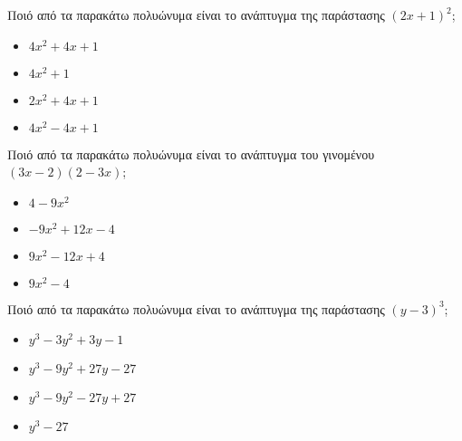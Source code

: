 \documentclass[ektypwsh]{diag-xelatex}
\begin{document}
\begin{thema}
\begin{rlist}
\begin{multicols}{4}
\end{multicols}
\item Ποιό από τα παρακάτω πολυώνυμα είναι το ανάπτυγμα της παράστασης $ (2x+1)^2 $;
\begin{multicols}{4}
\begin{itemize}
\item $ 4x^2+4x+1 $
\item $ 4x^2+1 $
\item $ 2x^2+4x+1 $
\item $ 4x^2-4x+1 $
\end{itemize}
\end{multicols}
\item Ποιό από τα παρακάτω πολυώνυμα είναι το ανάπτυγμα του γινομένου $ (3x-2)(2-3x) $;
\begin{multicols}{4}
\begin{itemize}
\item $ 4-9x^2 $
\item $ -9x^2+12x-4 $
\item $ 9x^2-12x+4 $
\item $ 9x^2-4 $
\end{itemize}
\end{multicols}
\item Ποιό από τα παρακάτω πολυώνυμα είναι το ανάπτυγμα της παράστασης $ (y-3)^3 $;
\begin{multicols}{4}
\begin{itemize}
\item $ y^3-3y^2+3y-1 $
\item $ y^3-9y^2+27y-27 $
\item $ y^3-9y^2-27y+27 $
\item $ y^3-27 $
\end{itemize}
\end{multicols}
\end{rlist}
\end{thema}
\newpage
\noindent
\askhseis
\end{document}
